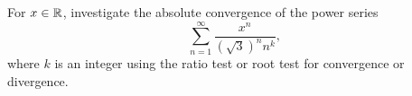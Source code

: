 \begin{exercise}
  \label{ex:hw04:scaled-power-series}
  For $x\in\mathbb{R}$, investigate the absolute convergence of the power series
  \[
    \sum_{n=1}^{\infty}\frac{x^n}{(\sqrt3)^n n^k},
  \]
  where $k$ is an integer using the ratio test or root test for convergence
  or divergence.
\end{exercise}
